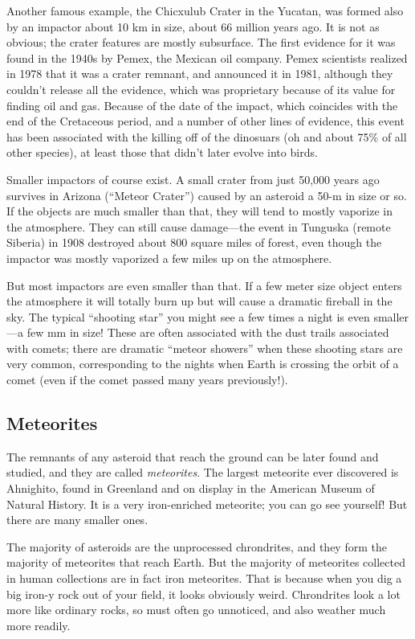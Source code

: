 \documentclass[12pt, preprint]{aastex}
\begin{document}
Another famous example, the Chicxulub Crater in the Yucatan, was
formed also by an impactor about 10 km in size, about 66 million years
ago. It is not as obvious; the crater features are mostly
subsurface. The first evidence for it was found in the 1940s by Pemex,
the Mexican oil company. Pemex scientists realized in 1978 that it was
a crater remnant, and announced it in 1981, although they couldn't
release all the evidence, which was proprietary because of its value
for finding oil and gas. Because of the date of the impact, which
coincides with the end of the Cretaceous period, and a number of other
lines of evidence, this event has been associated with the killing off
of the dinosuars (oh and about 75\% of all other species), at least
those that didn't later evolve into birds.

Smaller impactors of course exist. A small crater from just 50,000
years ago survives in Arizona (``Meteor Crater'') caused by an
asteroid a 50-m in size or so. If the objects are much smaller than
that, they will tend to mostly vaporize in the atmosphere. They can
still cause damage---the event in Tunguska (remote Siberia) in 1908
destroyed about 800 square miles of forest, even though the impactor
was mostly vaporized a few miles up on the atmosphere.

But most impactors are even smaller than that. If a few meter size
object enters the atmosphere it will totally burn up but will cause a
dramatic fireball in the sky. The typical ``shooting star'' you might
see a few times a night is even smaller---a few mm in size! These are
often associated with the dust trails associated with comets; there
are dramatic ``meteor showers'' when these shooting stars are very
common, corresponding to the nights when Earth is crossing the orbit
of a comet (even if the comet passed many years previously!).

\subsection{Meteorites}

The remnants of any asteroid that reach the ground can be later found
and studied, and they are called {\it meteorites}. The largest
meteorite ever discovered is Ahnighito, found in Greenland and on
display in the American Museum of Natural History. It is a very
iron-enriched meteorite; you can go see yourself! But there are many
smaller ones.

The majority of asteroids are the unprocessed chrondrites, and they
form the majority of meteorites that reach Earth. But the majority of
meteorites collected in human collections are in fact iron
meteorites. That is because when you dig a big iron-y rock out of your
field, it looks obviously weird. Chrondrites look a lot more like
ordinary rocks, so must often go unnoticed, and also weather much more
readily. 
\end{document}
